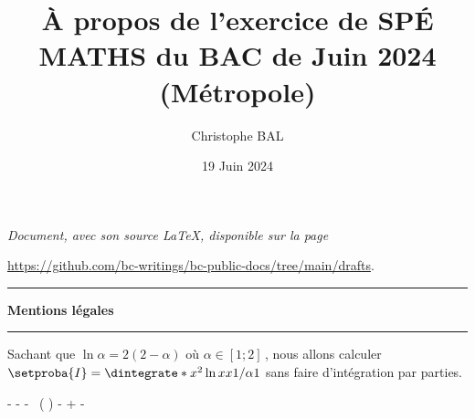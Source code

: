 \documentclass[12pt]{amsart}
\begin{document}
\title{À propos de l'exercice de SPÉ MATHS du BAC de Juin 2024 (Métropole)}
\author{Christophe BAL}
\date{19 Juin 2024}
\maketitle


\begin{center}
	\itshape
	Document, avec son source \LaTeX, disponible sur la page

	\url{https://github.com/bc-writings/bc-public-docs/tree/main/drafts}.
\end{center}


\bigskip


\begin{center}
	\hrule\vspace{.3em}
	{
		\fontsize{1.35em}{1em}\selectfont
		\textbf{Mentions \og légales \fg}
	}

	\vspace{0.45em}
	\doclicenseThis
	\hrule
\end{center}

\bigskip

Sachant que $\ln \alpha = 2(2 - \alpha)$ où $\alpha \in [1 ; 2]$\,, nous allons calculer $\setproba{I} = \dintegrate*{x^2 \ln x}{x}{1 / \alpha}{1}$ sans faire d'intégration par parties.

\medskip

\begin{stepcalc}[style=sar]
\explnext{}
	-
	-
\explnext{}
\explnext{}
\explnext{}
\explnext{}
	-
	 \, \ln \big(  \big)%
	-
	+
	-
\explnext{}
\explnext{}
\end{stepcalc}
\end{document}
